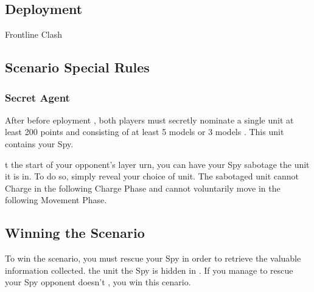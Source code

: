 
\label{MissionImpossible}


\subsection*{Deployment}

 Frontline Clash


\subsection*{Scenario Special Rules}

\subsubsection*{Secret Agent}

After  before eployment , both players must secretly nominate a single unit  at least 200 points and consisting of at least 5 models  or 3 models . This unit contains your Spy.
			
t the start of your opponent's layer urn, you can have your Spy sabotage the unit it is in. To do so, simply reveal your choice of unit. The sabotaged unit cannot Charge in the following Charge Phase and cannot voluntarily move in the following Movement Phase.

\subsection*{Winning the Scenario}

To win the scenario, you must rescue your Spy in order to retrieve the valuable information collected.  the unit the Spy is hidden in . If you manage to rescue your Spy  opponent doesn't , you win this cenario.
